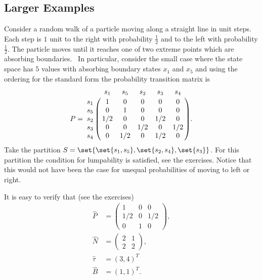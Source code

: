 \documentclass[12pt]{article}
\begin{document}
\subsection*{Larger Examples}

\begin{example}
    Consider a random walk%
    of a particle moving along a straight line in unit steps.  Each step
    is \( 1 \) unit to the right with probability \( \frac{1}{2} \) and
    to the left with probability \( \frac{1}{2} \).  The particle moves
    until it reaches one of two extreme points which are absorbing
    boundaries.~%
    In particular, consider the small case where the state space has \(
    5 \) values with absorbing boundary states \( x_1 \) and \( x_5 \)
    and using the ordering for the standard form the probability
    transition matrix is
    \[
        P = \bordermatrix{ & s_1 & s_5 & s_2 & s_3 & s_4 \cr
        s_1 & 1 & 0 & 0 & 0 & 0 \cr
        s_5 & 0 & 1 & 0 & 0 & 0 \cr
        s_2 & 1/2 & 0 & 0 &1/2 & 0 \cr
        s_3 & 0 & 0 & 1/2 & 0 & 1/2 \cr
        s_4 & 0 & 1/2 & 0 & 1/2 & 0 \cr
        }.
    \] Take the partition \( S = \set{ \set{s_1, s_5}, \set{s_2, s_4},
    \set{s_3}} \).  For this partition the condition for lumpability is
    satisfied, see the exercises.  Notice that this would not have been
    the case for unequal probabilities of moving to left or right.

    It is easy to verify that (see the exercises)
    \begin{align*}
        \hat{P} &=
        \begin{pmatrix}
            1 & 0 & 0 \\
            1/2 & 0 & 1/2 \\
            0 & 1 & 0
        \end{pmatrix}
        , \\
        \hat{N} &=
        \begin{pmatrix}
            2 & 1 \\
            2 & 2
        \end{pmatrix}
        , \\
        \hat{\tau} &= (3, 4)^T \\
        \hat{B} &= (1,1)^T.
    \end{align*}
\end{example}
\end{document}
